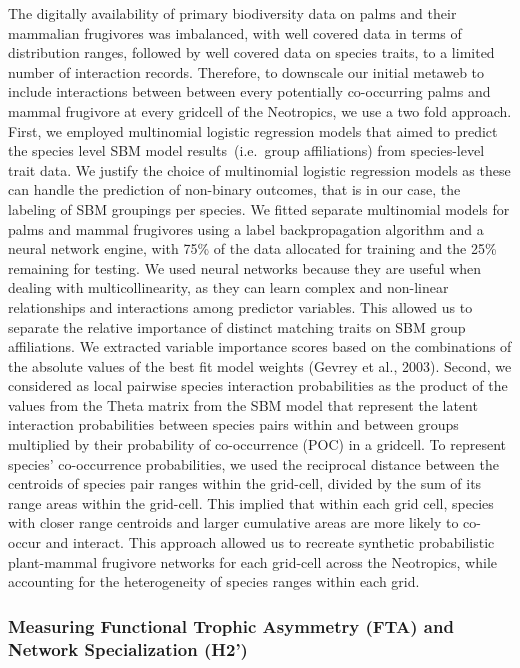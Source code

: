 \documentclass[
]{agujournal2019}
\begin{document}
The digitally availability of primary biodiversity data on palms and
their mammalian frugivores was imbalanced, with well covered data in
terms of distribution ranges, followed by well covered data on species
traits, to a limited number of interaction records. Therefore, to
downscale our initial metaweb to include interactions between between
every potentially co-occurring palms and mammal frugivore at every
gridcell of the Neotropics, we use a two fold approach. First, we
employed multinomial logistic regression models that aimed to predict
the species level SBM model results~(i.e.~group affiliations) from
species-level trait data. We justify the choice of multinomial logistic
regression models as these can handle the prediction of non-binary
outcomes, that is in our case, the labeling of SBM groupings per
species. We fitted separate multinomial models for palms and mammal
frugivores using a label backpropagation algorithm and a neural network
engine, with 75\% of the data allocated for training and the 25\%
remaining for testing. We used neural networks because they are useful
when dealing with multicollinearity, as they can learn complex and
non-linear relationships and interactions among predictor variables.
This allowed us to separate the relative importance of distinct matching
traits on SBM group affiliations. We extracted variable importance
scores based on the combinations of the absolute values of the best fit
model weights (Gevrey et al., 2003). Second, we considered as local
pairwise species interaction probabilities as the product of the values
from the Theta matrix from the SBM model that represent the latent
interaction probabilities between species pairs within and between
groups multiplied by their probability of co-occurrence (POC) in a
gridcell. To represent species' co-occurrence probabilities, we used the
reciprocal distance between the centroids of species pair ranges within
the grid-cell, divided by the sum of its range areas within the
grid-cell. This implied that within each grid cell, species with closer
range centroids and larger cumulative areas are more likely to co-occur
and interact. This approach allowed us to recreate synthetic
probabilistic plant-mammal frugivore networks for each grid-cell across
the Neotropics, while accounting for the heterogeneity of species ranges
within each grid.

\subsubsection{Measuring Functional Trophic Asymmetry (FTA) and Network
Specialization
(H2')}\label{measuring-functional-trophic-asymmetry-fta-and-network-specialization-h2}
\end{document}
